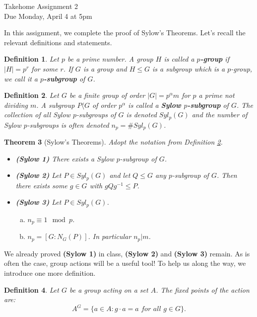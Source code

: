 \documentclass[11pt]{article}
\newtheorem{theorem}{Theorem}
\newtheorem{definition}[theorem]{Definition}
\newcommand{\la}{\langle}
\begin{document}
\begin{center}
\Large {Takehome Assignment 2}\\
\small {Due Monday, April 4 at 5pm}
\end{center}
In this assignment, we complete the proof of Sylow's Theorems.  Let's recall the relevant definitions and statements.
\begin{definition}
Let $p$ be a prime number.  A group $H$ is called a \textbf{$p$-group} if $|H| = p^r$ for some $r$.  If $G$ is a group and $H\le G$ is a subgroup which is a $p$-group, we call it a \textbf{$p$-subgroup} of $G$.
\end{definition}
\begin{definition}\label{maindef}
Let $G$ be a finite group of order $|G| = p^\alpha m$ for $p$ a prime not dividing $m$.  A subgroup $P\la G$ of order $p^\alpha$ is called a \textbf{Sylow $p$-subgroup} of $G$.  The collection of all Sylow $p$-subgroups of $G$ is denoted $Syl_p(G)$ and the number of Sylow $p$-subgroups is often denoted $n_p = \#Syl_p(G)$.
\end{definition}
\begin{theorem}[Sylow's Theorems]
Adopt the notation from Definition \ref{maindef}.
\begin{itemize}
\item{
\textbf{(Sylow 1)} There exists a Sylow $p$-subgroup of $G$.
}
\item{
\textbf{(Sylow 2)} Let $P\in Syl_p(G)$ and let $Q\le G$ any $p$-subgroup of $G$.  Then there exists some $g\in G$ with $gQg^{-1}\le P$.
}
\item{
\textbf{(Sylow 3)} Let $P\in Syl_p(G)$.
\begin{enumerate}[(a)]
\item $n_p\equiv 1\mod p$.
\item $n_p = [G:N_G(P)]$.  In particular $n_p|m$.
\end{enumerate}
}
\end{itemize}
\end{theorem}
We already proved \textbf{(Sylow 1)} in class, \textbf{(Sylow 2)} and \textbf{(Sylow 3)} remain.  As is often the case, group actions will be a useful tool!  To help us along the way, we introduce one more definition.
\begin{definition}
Let $G$ be a group acting on a set $A$.  The fixed points of the action are:
\[A^G = \{a\in A:g\cdot a = a\textit{ for all }g\in G\}.\]
\end{definition}
\end{document}
